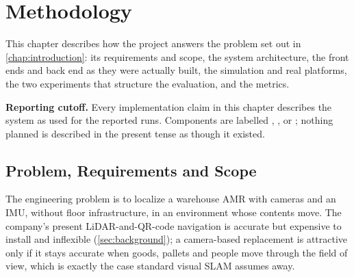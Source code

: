 \chapter[METHODOLOGY]{Methodology}
\label{chap:methodology}

This chapter describes how the project answers the problem set out in
\cref{chap:introduction}: its requirements and scope, the system architecture,
the front ends and back end as they were actually built, the simulation and real
platforms, the two experiments that structure the evaluation, and the metrics.

\textbf{Reporting cutoff.} Every implementation claim in this chapter describes
the system as used for the reported runs. Components are labelled
, ,  or ;
nothing planned is described in the present tense as though it existed.

\section{Problem, Requirements and Scope}
\label{sec:problem-scope}

The engineering problem is to localize a warehouse AMR with cameras and an IMU,
without floor infrastructure, in an environment whose contents move. The
company's present LiDAR-and-QR-code navigation is accurate but expensive to
install and inflexible (\cref{sec:background}); a camera-based replacement is
attractive only if it stays accurate when goods, pallets and people move
through the field of view, which is exactly the case standard visual SLAM
assumes away.

